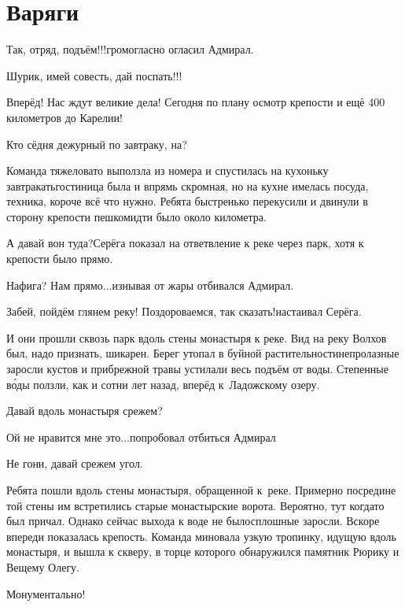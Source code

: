 \chapter{Варяги}
\vepsianrose
\fancyhead[LE]{\fancyplain{}{\bfseries \parttitle}}
\fancyhead[RO]{\fancyplain{}{\bfseries \rightmark}}

\diagdash Так, отряд, подъём!!!\mdash громогласно огласил Адмирал.

\diagdash Шурик, имей совесть, дай поспать!!!

\diagdash Вперёд! Нас ждут великие дела! Сегодня по плану осмотр крепости и ещё 400 километров до Карелии!

\diagdash Кто сёдня дежурный по завтраку, на?

Команда тяжеловато выползла из номера и спустилась на кухоньку завтракать\mdash гостиница была и впрямь скромная, но на кухне имелась посуда, техника, короче всё что нужно. Ребята быстренько перекусили и двинули в сторону крепости пешком\mdash идти было около километра.

\diagdash А давай вон туда?\mdash Серёга показал на ответвление к реке через парк, хотя к крепости было прямо.

\diagdash Нафига? Нам прямо$\ldots$\mdash изнывая от жары отбивался Адмирал.

\diagdash Забей, пойдём глянем реку! Поздороваемся, так сказать!\mdash настаивал Серёга.

И они прошли сквозь парк вдоль стены монастыря к реке. Вид на реку Волхов был, надо признать, шикарен. Берег утопал в буйной растительности\mdash непролазные заросли кустов и прибрежной травы устилали весь подъём от воды. Степенные в\'{о}ды ползли, как и сотни лет назад, вперёд к~Ладожскому озеру.

\mdash Давай вдоль монастыря срежем?

\mdash Ой не нравится мне это$\ldots$\mdash попробовал отбиться Адмирал

\mdash Не гони, давай срежем угол.

Ребята пошли вдоль стены монастыря, обращенной к~реке. Примерно посредине той стены им встретились старые монастырские ворота. Вероятно, тут когда\sdash то был причал. Однако сейчас выхода к воде не было\mdash сплошные заросли. Вскоре впереди показалась крепость. Команда миновала узкую тропинку, идущую вдоль монастыря, и вышла к скверу, в торце которого обнаружился памятник Рюрику и Вещему Олегу. 

\diagdash Монументально!

